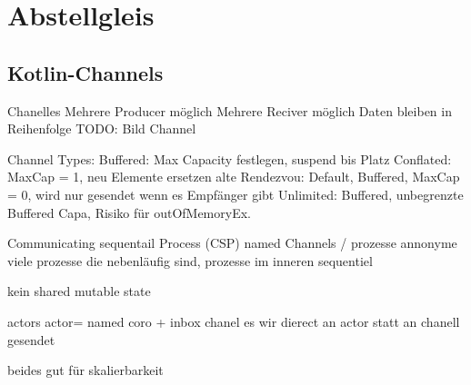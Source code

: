 \documentclass[fontsize=12pt,paper=a4,twoside=semi,parskip=half-,headsepline,headinclude]{scrreprt}
\begin{document}
\section{Abstellgleis}
\subsection{Kotlin-Channels}

Chanelles
Mehrere Producer möglich
Mehrere Reciver möglich
Daten bleiben in Reihenfolge
TODO: Bild Channel

Channel Types:
Buffered: Max Capacity festlegen, suspend bis Platz
Conflated: MaxCap = 1, neu Elemente ersetzen alte
Rendezvou: Default, Buffered, MaxCap = 0, wird nur gesendet wenn es Empfänger gibt
Unlimited: Buffered, unbegrenzte Buffered Capa, Risiko für outOfMemoryEx.

Communicating sequentail Process (CSP)
named Channels / prozesse annonyme
viele prozesse die nebenläufig sind, prozesse im inneren sequentiel

kein shared mutable state

actors
actor= named coro + inbox chanel
es wir dierect an actor statt an chanell gesendet

beides gut für skalierbarkeit

\printbibliography


%
%
%
%
%
%
%
\end{document}
